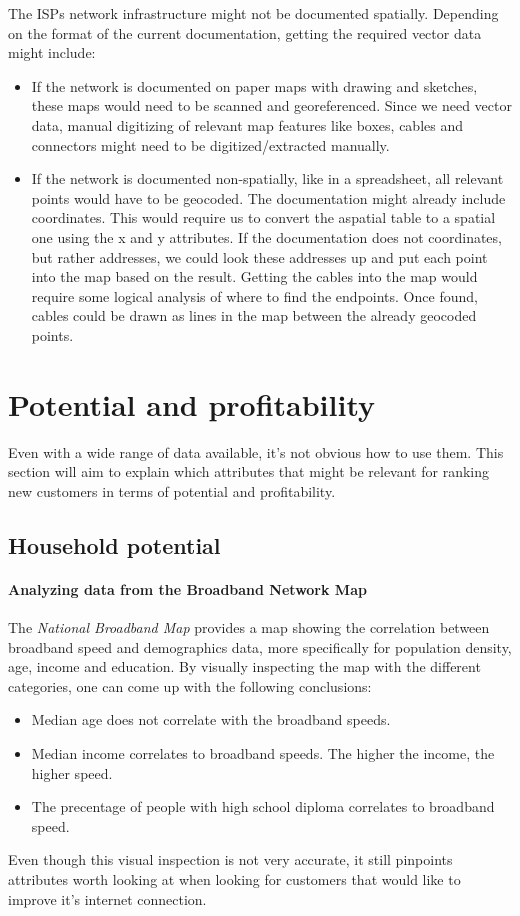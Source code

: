 \documentclass[twocolumn]{article}
\begin{document}
The ISPs network infrastructure might not be documented spatially. Depending on the format of the current documentation, getting the required vector data might include:
\begin{itemize}
  \item If the network is documented on paper maps with drawing and sketches, these maps would need to be scanned and georeferenced. Since we need vector data, manual digitizing of relevant map features like boxes, cables and connectors might need to be digitized/extracted manually.
  \item If the network is documented non-spatially, like in a spreadsheet, all relevant points would have to be geocoded. The documentation might already include coordinates. This would require us to convert the aspatial table to a spatial one using the x and y attributes. If the documentation does not coordinates, but rather addresses, we could look these addresses up and put each point into the map based on the result. Getting the cables into the map would require some logical analysis of where to find the endpoints. Once found, cables could be drawn as lines in the map between the already geocoded points.
\end{itemize}


\section{Potential and profitability}
\label{sec:Potential and profitability}
Even with a wide range of data available, it's not obvious how to use them. This section will aim to explain which attributes that might be relevant for ranking new customers in terms of potential and profitability.

\subsection{Household potential}
\label{sub:Potential}

\paragraph{Analyzing data from the Broadband Network Map}
\label{sub:Analyzing data from the Broadband Network Map}
The \textit{National Broadband Map} provides a map showing the correlation between broadband speed and demographics data, more specifically for population density, age, income and education. By visually inspecting the map with the different categories, one can come up with the following conclusions:
\begin{itemize}
  \item Median age does not correlate with the broadband speeds. 
  \item Median income correlates to broadband speeds. The higher the income, the higher speed.
  \item The precentage of people with high school diploma correlates to broadband speed.
\end{itemize}
Even though this visual inspection is not very accurate, it still pinpoints attributes worth looking at when looking for customers that would like to improve it's internet connection.
\end{document}
